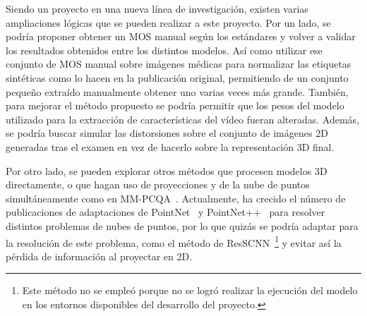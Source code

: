 Siendo un proyecto en una nueva línea de investigación, existen varias ampliaciones 
lógicas que se pueden realizar a este proyecto. Por un lado, se podría proponer 
obtener un MOS manual según los estándares y volver a validar los resultados obtenidos
entre los distintos modelos. Así como utilizar ese conjunto de MOS manual sobre imágenes médicas 
para normalizar las etiquetas sintéticas como lo hacen en la publicación original, 
permitiendo de un conjunto pequeño extraído manualmente obtener uno varias 
veces más grande. También, para mejorar el método propuesto se podría permitir 
que los pesos del modelo utilizado para la extracción de características 
del vídeo fueran alteradas. Además, se podría buscar simular las distorsiones 
sobre el conjunto de imágenes 2D generadas tras el examen en vez de hacerlo 
sobre la representación 3D final. 

Por otro lado, se pueden explorar otros métodos que procesen modelos 3D directamente, 
o que hagan uso de proyecciones y de la nube de puntos simultáneamente como en MM-PCQA~\cite{MM-PCQA}.
Actualmente, ha crecido el número de publicaciones de adaptaciones de PointNet~\cite{PointNet} y 
PointNet++~\cite{PointNet++} para resolver distintos problemas de nubes de puntos, 
por lo que quizás se podría adaptar para la resolución de este problema, como 
el método de ResSCNN~\cite{ResSCNN}\footnote{Este método no se empleó porque no se 
logró realizar la ejecución del modelo en los entornos disponibles 
del desarrollo del proyecto.} y evitar así 
la pérdida de información al proyectar en 2D.


